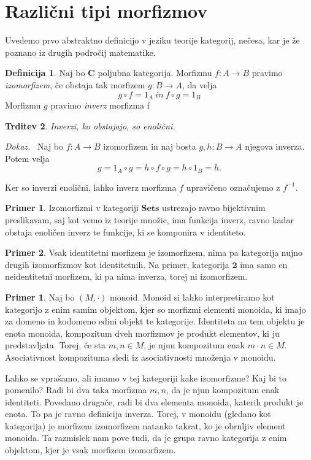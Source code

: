 \documentclass[12pt,a4paper]{book}
\theoremstyle{definition}
\newtheorem{definicija}{Definicija}[chapter]
\theoremstyle{plain}
\newtheorem{trditev}[definicija]{Trditev}
\newenvironment{dokaz}{\emph{Dokaz.}\ }{\hspace{\fill}{$\Box$}}
\theoremstyle{definition}
\newtheorem{primer}{Primer}[section]
\newtheorem*{primer*}{Primer}
\theoremstyle{remark}
\newcommand{\cat}[1]{\textbf{#1}}
\begin{document}
\section{Različni tipi morfizmov}
Uvedemo prvo abstraktno definicijo v jeziku teorije kategorij, nečesa, kar je že poznano iz drugih področij matematike.

\begin{definicija} Naj bo \cat{C} poljubna kategorija. Morfizmu $f : A \to B$ pravimo \emph{izomorfizem}, če obstaja tak morfizem $g : B \to A$, da velja
$$g \circ f = 1_A \ in \ f \circ g = 1_B$$
Morfizmu $g$ pravimo \emph{inverz} morfizma f
\end{definicija}

\begin{trditev} Inverzi, ko obstajajo, so enolični.
\end{trditev}
\begin{dokaz}
Naj bo $f : A \to B$ izomorfizem in naj bosta $g,h: B \to A$ njegova inverza. Potem velja 
$$g = 1_A \circ g = h \circ f \circ g = h \circ 1_B = h.$$
\end{dokaz}

Ker so inverzi enolični, lahko inverz morfizma $f$ upravičeno označujemo z $f^{-1}$.

\begin{primer*}
Izomorfizmi v kategoriji $\cat{Sets}$ ustrezajo ravno bijektivnim preslikavam, saj kot vemo iz teorije množic, ima funkcija inverz, ravno kadar obstaja enoličen inverz te funkcije, ki se komponira v identiteto. 
\end{primer*}

\begin{primer*}
Vsak identitetni morfizem je izomorfizem, nima pa kategorija nujno drugih izomorfizmov kot identitetnih. Na primer, kategorija $\cat{2}$ ima samo en neidentitetni morfizem, ki pa nima inverza, torej ni izomorfizem.
\end{primer*}

\begin{primer}
Naj bo $(M,\cdot)$ monoid. Monoid si lahko interpretiramo kot kategorijo z enim samim objektom, kjer so morfizmi elementi monoida, ki imajo za domeno in kodomeno edini objekt te kategorije. Identiteta na tem objektu je enota monoida, kompozitum dveh morfizmov je produkt elementov, ki ju predstavljata. Torej, če sta $m,n \in M$, je njun kompozitum enak $m \cdot n \in M$. Asociativnost kompozituma sledi iz asociativnosti množenja v monoidu.

Lahko se vprašamo, ali imamo v tej kategoriji kake izomorfizme? Kaj bi to pomenilo? Radi bi dva taka morfizma $m,n$, da je njun kompozitum enak identiteti. Povedano drugače, radi bi dva elementa monoida, katerih produkt je enota. To pa je ravno definicija inverza. Torej, v monoidu (gledano kot kategorija) je morfizem izomorfizem natanko takrat, ko je obrnljiv element monoida. Ta razmislek nam pove tudi, da je grupa ravno kategorija z enim objektom, kjer je vsak morfizem izomorfizem.
\end{primer}
\end{document}
